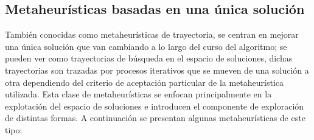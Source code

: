 \subsection{Metaheurísticas basadas en una única solución}

También conocidas como metaheurísticas de trayectoria, se centran en mejorar una única solución que van cambiando a lo largo del curso del algoritmo; se pueden ver como trayectorias de búsqueda en el espacio de soluciones, dichas trayectorias son trazadas por procesos iterativos que se mueven de una solución a otra dependiendo del criterio de aceptación particular de la metaheurística utilizada. Esta clase de metaheurísticas se enfocan principalmente en la explotación del espacio de soluciones e introducen el componente de exploración de distintas formas. A continuación se presentan algunas metaheurísticas de este tipo: 

